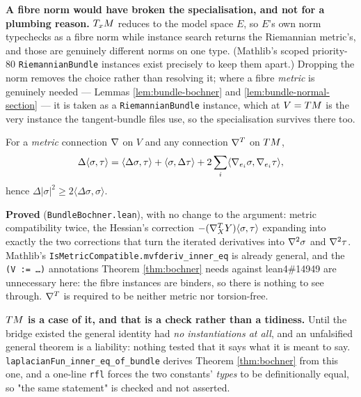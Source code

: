\begin{lemma}
  \textbf{A fibre norm would have broken the specialisation, and not for a plumbing
  reason.} $T_xM$ reduces to the model space $E$, so $E$'s own norm typechecks as a fibre
  norm while instance search returns the Riemannian metric's, and those are genuinely
  different norms on one type. (Mathlib's scoped priority-$80$
  \texttt{RiemannianBundle} instances exist precisely to keep them apart.) Dropping the
  norm removes the choice rather than resolving it; where a fibre \emph{metric} is
  genuinely needed --- Lemmas \ref{lem:bundle-bochner} and
  \ref{lem:bundle-normal-section} --- it is taken as a \texttt{RiemannianBundle}
  instance, which at $V = TM$ is the very instance the tangent-bundle files use, so the
  specialisation survives there too.
\end{lemma}

\begin{lemma}
  \label{lem:bundle-bochner}
  \leanok
  For a \emph{metric} connection $\nabla$ on $V$ and any connection $\nabla^T$ on $TM$,
  \[
    \Delta\langle\sigma,\tau\rangle
      = \langle\Delta\sigma,\tau\rangle + \langle\sigma,\Delta\tau\rangle
        + 2\sum_i \langle\nabla_{e_i}\sigma, \nabla_{e_i}\tau\rangle,
  \]
  hence $\Delta|\sigma|^2 \ge 2\langle\Delta\sigma,\sigma\rangle$.

  \textbf{Proved} (\texttt{BundleBochner.lean}), with no change to the argument: metric
  compatibility twice, the Hessian's correction $-(\nabla^T_X Y)\langle\sigma,\tau\rangle$
  expanding into exactly the two corrections that turn the iterated derivatives into
  $\nabla^2\sigma$ and $\nabla^2\tau$. Mathlib's
  \texttt{IsMetricCompatible.mvfderiv\_inner\_eq} is already general, and the
  \texttt{(V := \ldots)} annotations Theorem \ref{thm:bochner} needs against lean4\#14949
  are unnecessary here: the fibre instances are binders, so there is nothing to see through.
  $\nabla^T$ is required to be neither metric nor torsion-free.

  \textbf{$TM$ is a case of it, and that is a check rather than a tidiness.} Until the
  bridge existed the general identity had \emph{no instantiations at all}, and an
  unfalsified general theorem is a liability: nothing tested that it says what it is meant
  to say. \texttt{laplacianFun\_inner\_eq\_of\_bundle} derives Theorem \ref{thm:bochner}
  from this one, and a one-line \texttt{rfl} forces the two constants' \emph{types} to be
  definitionally equal, so "the same statement" is checked and not asserted.


\end{lemma}
